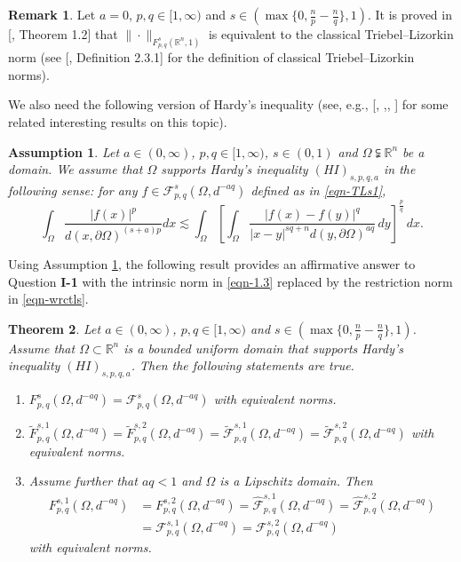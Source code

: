 \documentclass[11pt,twoside]{article}
\def\rn{{\mathbb{R}^n}}
\def\boz{{\Omega}}
\def\pa{\partial}                %
\newcounter{assum}
\newtheorem{assumption}[assum]{Assumption}
\newtheorem{theorem}{Theorem}[section]
\theoremstyle{mylem}
\theoremstyle{definition}
\newtheorem{remark}[theorem]{Remark}
\numberwithin{equation}{section}
\begin{document}
\begin{remark}
Let $a=0$, $p,q\in[1,\infty)$ and $s\in(\max\{0,\frac{n}{p} - \frac{n}{q}\},1)$. It is proved in [\cite{ps2017}, Theorem 1.2] that $\|\cdot\|_{F_{p,q}^s(\rn,1)}$ is equivalent to the classical Triebel--Lizorkin norm (see [\cite{t2010}, Definition 2.3.1] for the definition of classical Triebel--Lizorkin norms).
\end{remark}
We also need the following version of Hardy's inequality
(see, e.g.,  [\cite{dk2024}, \cite{k2023},\cite{iv2013}, \cite{iv2015}] for some related interesting results on this topic).

\begin{assumption}\label{1617}
Let $a\in(0,\infty)$, $ p, q\in[1,\infty)$, $s\in(0,1)$ and $\boz \subsetneqq \rn$ be a domain.
We assume that $\boz$ supports {Hardy's inequality}
$(HI)_{s,p,q,a}$ in the following sense: for any $f \in \mathcal F_{p, q}^{s}(\boz,d^{-aq})$ defined as in \eqref{eqn-TLs1},
\begin{equation}\label{eqn-Hardy}
\int_{\boz}  \frac{|f(x)|^p}{d(x, \pa\boz)^{(s+a)p}} dx \lesssim  \int_{\boz} \left[\int_{\boz} \frac{|f(x) - f(y)|^q}
{|x - y|^{s q + n}d(y,\pa\boz)^{aq}}\,dy \right]^{\frac{p}{q}}\,dx.
\end{equation}
\end{assumption}



Using Assumption \ref{1617}, the following result provides an affirmative answer to  Question {\bf I-1}
with  the intrinsic norm in \eqref{eqn-1.3} replaced by the restriction norm in \eqref{eqn-wrctls}.


\begin{theorem}\label{co-main} 
Let $a\in(0,\infty)$, $p,q \in [1, \infty)$ and $s\in(\max\{0,\frac{n}{p} - \frac{n}{q}\},1)$. 
Assume that \(\Omega\subset\mathbb{R}^n\) is a bounded uniform domain that  supports Hardy's inequality
$(HI)_{s,p,q,a}$. Then the following statements are true.
\begin{enumerate}
\item[\rm(i)]$F_{p,q}^{s}(\boz,d^{-aq})=\mathcal F_{p,q}^{s}(\boz,d^{-aq})$ with equivalent norms.
\item[\rm(ii)]
$\widetilde{F}_{p,q}^{s,1}
(\boz,d^{-aq})
=\widetilde{F}_{p,q}^{s,2}
(\boz,d^{-aq})
=\widetilde{\mathcal{F}}_{p,q}^{s,1}(\boz,d^{-aq}) =\widetilde{\mathcal{F}}_{p,q}^{s,2}(\boz,d^{-aq})$
with equivalent norms.
\item[\rm(iii)]
Assume further that $aq<1$ and $\Omega$ is a Lipschitz domain.
Then 
\begin{align*}
F_{p,q}^{s,1}(\boz,d^{-aq})
&= F_{p,q}^{s,2}(\boz,d^{-aq})
=\widehat{\mathcal{F}}_{p,q}^{s,1}(\boz,d^{-aq})
=\widehat{\mathcal{F}}_{p,q}^{s,2}(\boz,d^{-aq})\\
&=\mathcal{F}_{p,q}^{s,1}(\boz,d^{-aq})= \mathcal{F}_{p,q}^{s,2}(\boz,d^{-aq})
\end{align*}
with equivalent norms.
\end{enumerate}
\end{theorem}
\end{document}
